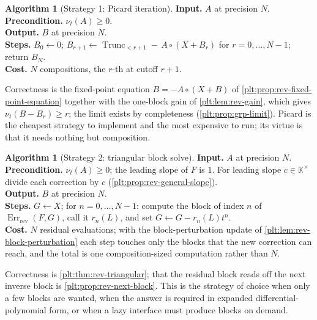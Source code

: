 \documentclass[11pt,oneside]{article}
\theoremstyle{plain}
\theoremstyle{definition}
\newtheorem{algorithm}[theorem]{Algorithm}
\theoremstyle{remark}
\newcommand{\K}{\mathbb{K}}
\newcommand{\ordt}{\nu_{t}}                              %
\newcommand{\Trunc}[2]{\operatorname{Trunc}_{<#2}#1}     %
\newcommand{\compose}{\mathbin{\circ}}
\newcommand{\RevErr}[2]{\operatorname{Err}_{\mathrm{rev}}\!\left(#1,#2\right)}
\begin{document}
\begin{algorithm}[Strategy 1: Picard iteration]\label{plt:alg:reverse-picard}
\textbf{Input.}  \(A\) at precision \(N\).\\
\textbf{Precondition.}  \(\ordt(A)\ge0\).\\
\textbf{Output.}  \(B\) at precision \(N\).\\
\textbf{Steps.}  \(B_0\leftarrow0\); \(B_{r+1}\leftarrow
\Trunc{-\,A\compose(X+B_r)}{r+1}\) for \(r=0,\dots,N-1\); return \(B_N\).\\
\textbf{Cost.}  \(N\) compositions, the \(r\)-th at cutoff \(r+1\).
\end{algorithm}

Correctness is the fixed-point equation \(B=-A\compose(X+B)\) of
\cref{plt:prop:rev-fixed-point-equation} together with the one-block gain of
\cref{plt:lem:rev-gain}, which gives \(\ordt(B-B_r)\ge r\); the limit exists by
completeness (\cref{plt:prop:grp-limit}).  Picard is the cheapest strategy to
implement and the most expensive to run; its virtue is that it needs nothing
but composition.

\begin{algorithm}[Strategy 2: triangular block solve]
\label{plt:alg:reverse-triangular}
\textbf{Input.}  \(A\) at precision \(N\).\\
\textbf{Precondition.}  \(\ordt(A)\ge0\); the leading slope of \(F\) is \(1\).
For leading slope \(c\in\K^{\times}\) divide each correction by \(c\)
(\cref{plt:prop:rev-general-slope}).\\
\textbf{Output.}  \(B\) at precision \(N\).\\
\textbf{Steps.}  \(G\leftarrow X\); for \(n=0,\dots,N-1\): compute the block of
index \(n\) of \(\RevErr{F}{G}\), call it \(r_n(L)\), and set
\(G\leftarrow G-r_n(L)t^n\).\\
\textbf{Cost.}  \(N\) residual evaluations; with the block-perturbation update
of \cref{plt:lem:rev-block-perturbation} each step touches only the blocks that
the new correction can reach, and the total is one composition-sized
computation rather than \(N\).
\end{algorithm}

Correctness is \cref{plt:thm:rev-triangular}; that the residual block reads off
the next inverse block is \cref{plt:prop:rev-next-block}.  This is the strategy
of choice when only a few blocks are wanted, when the answer is required in
expanded differential-polynomial form, or when a lazy interface must produce
blocks on demand.
\end{document}

